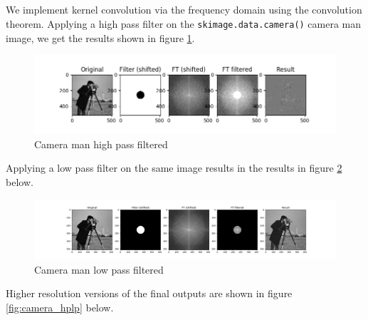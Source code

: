 \documentclass[]{article}
\begin{document}
\subsection{}
We implement kernel convolution via the frequency domain using the convolution theorem. Applying a high pass filter on the \texttt{skimage.data.camera()} camera man image, we get the results shown in figure \ref{fig:cameraman_hp}.
\begin{figure}[H]
\centering
\includegraphics[width=\textwidth]{camera_hp_verbose}
\caption{Camera man high pass filtered}
\label{fig:cameraman_hp}
\end{figure}
Applying a low pass filter on the same image results in the results in figure \ref{fig:cameraman_lp} below.
\begin{figure}[H]
\centering
\includegraphics[width=\textwidth]{camera_lp_verbose}
\caption{Camera man low pass filtered}
\label{fig:cameraman_lp}
\end{figure}
Higher resolution versions of the final outputs are shown in figure \ref{fig:camera_hplp} below.
\end{document}
